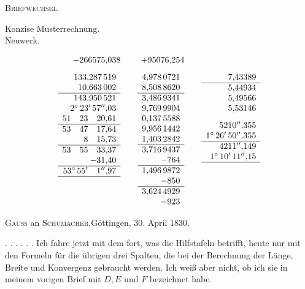 \par\clearpage
{}\hfill\textsc{Briefwechsel.}\hfill\mbox{}\par\medskip
\begin{center}Konzise Musterrechnung.\\Neuwerk.\end{center}
\[
\begin{array}{r@{\qquad}r@{\qquad}r}
-266575{,}038&+95076{,}254&\\[8pt]
\begin{array}[t]{r}
133{,}287\,519\\10{,}663\,002\\\hline
143{,}950\,521\\2^\circ\,23'\,57''{,}03\\51\quad23\quad20{,}61\\\hline
53\quad47\quad17{,}64\\8\quad15{,}73\\\hline
53\quad55\quad33{,}37\\-31{,}40\\\hline
53^\circ\,55'\quad1''{,}97\\\hline
\end{array}&
\begin{array}[t]{r}
4{,}978\,0721\\8{,}508\,8620\\\hline
3{,}486\,9341\\9{,}769\,9904\\0{,}137\,5588\\9{,}956\,1442\\1{,}403\,2842\\\hline
3{,}716\,9437\\-764\\\hline
1{,}496\,9872\\-850\\\hline
3{,}624\,4929\\-923
\end{array}&
\begin{array}[t]{r}
7{,}43389\\\hline5{,}44934\\5{,}49566\\5{,}53146\\[8pt]
5210''{,}355\\1^\circ\,26'\,50''{,}355\\\hline
4211''{,}149\\1^\circ\,10'\,11''{,}15\\\hline
\end{array}
\end{array}
\]
\bigskip
\begin{center}\textsc{Gauss} an \textsc{Schumacher}.\quad Göttingen, 30. April 1830.\end{center}
. . . . . . Ich fahre jetzt mit dem fort, was die Hilfstafeln betrifft, heute nur mit den Formeln für die übrigen drei Spalten, die bei der Berechnung der Länge, Breite und Konvergenz gebraucht werden. Ich weiß aber nicht, ob ich sie in meinem vorigen Brief mit \(D,E\) und \(F\) bezeichnet habe.

